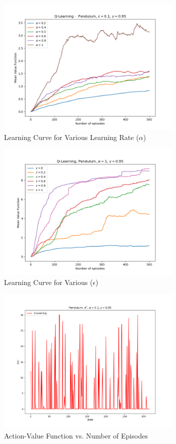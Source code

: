\documentclass[conference]{IEEEtran}
\begin{document}
\begin{figure}[!htbp]
\centerline{\includegraphics[width=3.5in]{p_ql_learning_curves_alpha}}
\caption{Learning Curve for Various Learning Rate ($\alpha$)}
\label{fig}
\end{figure}
\FloatBarrier

\begin{figure}[!htbp]
\centerline{\includegraphics[width=3.5in]{p_ql_learning_curves_epsilon}}
\caption{Learning Curve for Various ($\epsilon$)}
\label{fig}
\end{figure}
\FloatBarrier

\begin{figure}[!htbp]
\centerline{\includegraphics[width=3.5in]{p_ql_policy}}
\caption{Action-Value Function vs. Number of Episodes}
\label{fig}
\end{figure}
\FloatBarrier
\end{document}
